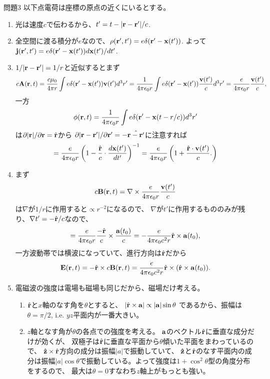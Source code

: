 \documentclass[fleqn]{jbook}
\begin{document}
\begin{answer}{問題3}{}
以下点電荷は座標の原点の近くにいるとする。
\begin{enumerate}
\item 光は速度$c$で伝わるから、$t'=t-|\mathbf r-\mathbf r'|/c$.
\item 全空間に渡る積分が$e$なので、$\rho(\mathbf r',t')=e\delta(\mathbf r'-\mathbf x(t'))$.
よって$\mathbf j(\mathbf r',t')=e\delta(\mathbf r'-\mathbf x(t'))d\mathbf x(t')/dt'$.
\item $1/|\mathbf r-\mathbf r'|=1/r$と近似するとまず\[
c\mathbf A(\mathbf r,t)=\frac{c\mu_0}{4\pi r}\int e\delta(\mathbf r'-\mathbf x(t'))\mathbf v(t')d^3r'
=\frac{1}{4\pi\epsilon_0 r}\int e\delta(\mathbf r'-\mathbf x(t'))\frac{\mathbf v(t')}{c}d^3r'
=\frac{e}{4\pi\epsilon_0 r}\frac{\mathbf v(t')}{c},
\]一方\[
\phi(\mathbf r,t)=\frac1{4\pi\epsilon_0r}\int e\delta(\mathbf r'-\mathbf x(t-r/c))d^3r'
\]は$\partial |\mathbf r|/\partial \mathbf r=\hat{\mathbf r}$から
$\partial |\mathbf r-\mathbf r'|/\partial \mathbf r'=-\hat{\mathbf r-\mathbf r'}$に注意すれば\[
=\frac e{4\pi\epsilon_0 r}\left(1-\frac{\hat{\mathbf r}}c\cdot \frac
{d\mathbf x(t')}{dt'}\right)^{-1}
=\frac{e}{4\pi\epsilon_0 r}\left(1+\frac{\hat{\mathbf r}\cdot\mathbf v(t')}{c}.\right)
\]
\item まず\[
c\mathbf B(\mathbf r,t)=\nabla\times \frac{e}{4\pi\epsilon_0 r}\frac{\mathbf v(t')}{c}
\]は$\nabla $が$1/r$に作用すると$\propto r^{-2}$になるので、
$\nabla $が$t'$に作用するもののみが残り、$\nabla t'=-\hat{\mathbf r}/c$なので、\[
=\frac{e}{4\pi\epsilon_0 r}\frac{-\hat{\mathbf r}}{c}\times\frac{\mathbf a(t_0)}{c}
=-\frac{e}{4\pi\epsilon_0c^2 r}\hat{\mathbf r}\times\mathbf a(t_0),
\]一方波動帯では横波になっていて、進行方向は$\hat{\mathbf r}$だから\[
\mathbf E(\mathbf r,t)=-\hat{\mathbf r}\times c\mathbf B(\mathbf r,t)
=\frac{e}{4\pi\epsilon_0c^2 r}\hat{\mathbf r}\times(\hat{\mathbf r}\times\mathbf a(t_0)).
\]
\item 電磁波の強度は電場も磁場も同じだから、磁場だけ考える。
\begin{enumerate}
\item $\hat{\mathbf r}$と$x$軸のなす角を$\theta$とすると、
$|\hat{\mathbf r}\times\mathbf a| \propto |\mathbf a|\sin\theta$
であるから、振幅は$\theta=\pi/2$, i.e. $yz$平面内が一番大きい。
\item $z$軸となす角が$\theta$の各点での強度を考える。
${\mathbf a}$のベクトル$\hat{\mathbf r}$に垂直な成分だけが効くが、
双極子は$\hat{\mathbf r}$に垂直な平面から$\theta$傾いた平面をまわっているので、
$\mathbf{\hat z}\times\hat{\mathbf r}$方向の成分は振幅$|a|$で振動していて、
$\mathbf{\hat z}$と$\hat{\mathbf r}$のなす平面内の成分は振幅$|a|\cos\theta$で振動している。よって強度は$1+\cos^2\theta$型の角度分布をするので、
最大は$\theta=0$すなわち$z$軸上がもっとも強い。

\end{enumerate}
\end{enumerate}

\end{answer}
\end{document}
